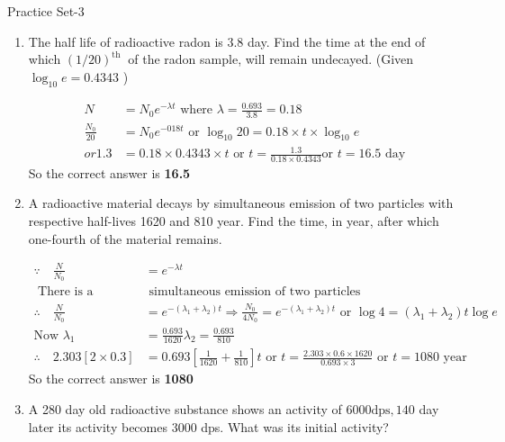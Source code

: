 \newpage
\begin{abox}
	Practice Set-3
	\end{abox}
\begin{enumerate}
	\item  The half life of radioactive radon is $3.8$ day. Find the time at the end of which $(1 / 20)^{\text {th }}$ of the radon sample, will remain undecayed. (Given $\log _{10} e=0.4343$ )
	\begin{answer}
		\begin{align*}
		N&=N_0e^{-\lambda t}\text { where } \lambda=\frac{0.693}{3.8}=0.18\\
		\frac{N_0}{20}&=N_0 e^{-018 t}\text{ or }\log _{10} 20=0.18 \times t \times \log _{10} e\\
		or 1.3&=0.18 \times 0.4343 \times t\text{ or }t=\frac{1.3}{0.18 \times 0.4343} \text{or }t=16.5\text{ day}
		\end{align*}
		So the correct answer is \textbf{16.5}
	\end{answer}
		\item  A radioactive material decays by simultaneous emission of two particles with respective half-lives 1620 and 810 year. Find the time, in year, after which one-fourth of the material remains.
	\begin{answer}
		\begin{align*}
		\because \quad\frac{N}{N_0}&=e^{-\lambda t}\\
	\text{	There is a}&\text{ simultaneous emission of two particles}\\
		\therefore \quad\frac{N}{N_0}&=e^{-\left(\lambda_1+\lambda_2\right) t} \Rightarrow \frac{N_0}{4 N_0}=e^{-\left(\lambda_1+\lambda_2\right) t} \text { or } \log 4=\left(\lambda_1+\lambda_2\right) t \log e\\
		\text{Now }\lambda_1&=\frac{0.693}{1620} \lambda_2=\frac{0.693}{810}\\
		\therefore \quad2.303[2 \times 0.3]&=0.693\left[\frac{1}{1620}+\frac{1}{810}\right] t \text { or } t=\frac{2.303 \times 0.6 \times 1620}{0.693 \times 3} \text { or } t=1080 \text { year }
		\end{align*}
			So the correct answer is \textbf{1080}
	\end{answer}
		\item  A 280 day old radioactive substance shows an activity of $6000 \mathrm{dps}, 140$ day later its activity becomes 3000 dps. What was its initial activity?
	\begin{answer}
		\begin{align*}

\end{align*}
\end{answer}
\end{enumerate}
